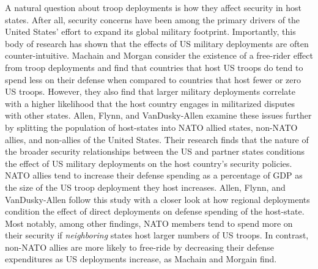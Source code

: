 A natural question about troop deployments is how they affect security in host states. After all, security concerns have been among the primary drivers of the United States' effort to expand its global military footprint. Importantly, this body of research has shown that the effects of US military deployments are often counter-intuitive. Machain and Morgan consider the existence of a free-rider effect from troop deployments and find that countries that host US troops do tend to spend less on their defense when compared to countries that host fewer or zero US troops.\autocite{machainandmorgan2013} However, they also find that larger military deployments correlate with a higher likelihood that the host country engages in militarized disputes with other states. Allen, Flynn, and VanDusky-Allen examine these issues further by splitting the population of host-states into NATO allied states, non-NATO allies, and non-allies of the United States.\autocite{allenetal2016} Their research finds that the nature of the broader security relationships between the US and partner states conditions the effect of US military deployments on the host country's security policies. NATO allies tend to increase their defense spending as a percentage of GDP as the size of the US troop deployment they host increases. Allen, Flynn, and VanDusky-Allen follow this study with a closer look at how regional deployments condition the effect of direct deployments on defense spending of the host-state.\autocite{allenetal2017} Most notably, among other findings, NATO members tend to spend more on their security if \textit{neighboring} states host larger numbers of US troops. In contrast, non-NATO allies are more likely to free-ride by decreasing their defense expenditures as US deployments increase, as Machain and Morgain find.\autocite{machainandmorgan2013} 


